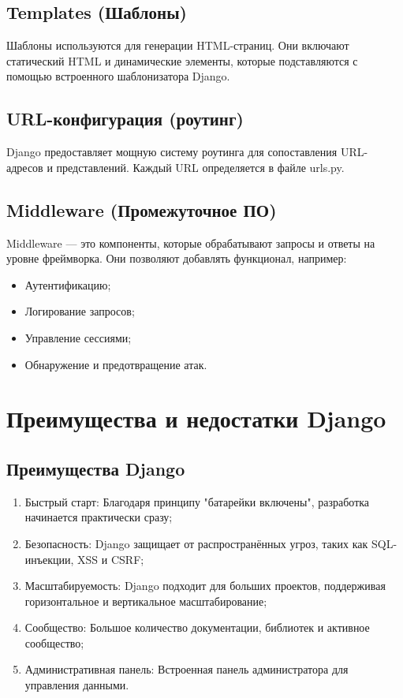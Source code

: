 \subsection*{Templates (Шаблоны)}
Шаблоны используются для генерации HTML-страниц. Они включают статический HTML и динамические элементы, которые подставляются с помощью встроенного шаблонизатора Django.

\subsection*{URL-конфигурация (роутинг)}
Django предоставляет мощную систему роутинга для сопоставления URL-адресов и представлений. Каждый URL определяется в файле urls.py.

\subsection*{Middleware (Промежуточное ПО)}
Middleware — это компоненты, которые обрабатывают запросы и ответы на уровне фреймворка. Они позволяют добавлять функционал, например:
\begin{itemize}
    \item Аутентификацию;
    \item Логирование запросов;
    \item Управление сессиями;
    \item Обнаружение и предотвращение атак.
\end{itemize}

\section{Преимущества и недостатки Django}
\subsection*{Преимущества Django}
\begin{enumerate}
    \item Быстрый старт: Благодаря принципу "батарейки включены", разработка начинается практически сразу;
    \item Безопасность: Django защищает от распространённых угроз, таких как SQL-инъекции, XSS и CSRF;
    \item Масштабируемость: Django подходит для больших проектов, поддерживая горизонтальное и вертикальное масштабирование;
    \item Сообщество: Большое количество документации, библиотек и активное сообщество;
    \item Административная панель: Встроенная панель администратора для управления данными.
\end{enumerate}

